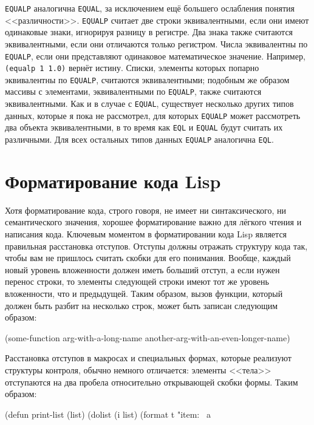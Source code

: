 \lstinline{EQUALP} аналогична \lstinline{EQUAL}, за исключением ещё большего ослабления понятия
<<различности>>. \lstinline{EQUALP} считает две строки эквивалентными, если они имеют
одинаковые знаки, игнорируя разницу в регистре. Два знака также считаются эквивалентными,
если они отличаются только регистром. Числа эквивалентны по \lstinline{EQUALP}, если они
представляют одинаковое математическое значение. Например, \lstinline{(equalp 1 1.0)} вернёт
истину. Списки, элементы которых попарно эквивалентны по \lstinline{EQUALP}, считаются
эквивалентными; подобным же образом массивы с элементами, эквивалентными по
\lstinline{EQUALP}, также считаются эквивалентными. Как и в случае с \lstinline{EQUAL},
существует несколько других типов данных, которые я пока не рассмотрел, для которых
\lstinline{EQUALP} может рассмотреть два объекта эквивалентными, в то время как \lstinline{EQL}
и \lstinline{EQUAL} будут считать их различными. Для всех остальных типов данных
\lstinline{EQUALP} аналогична \lstinline{EQL}.

\section{Форматирование кода Lisp}

Хотя форматирование кода, строго говоря, не имеет ни синтаксического, ни семантического
значения, хорошее форматирование важно для лёгкого чтения и написания кода. Ключевым
моментом в форматировании кода Lisp является правильная расстановка отступов. Отступы
должны отражать структуру кода так, чтобы вам не пришлось считать скобки для его
понимания. Вообще, каждый новый уровень вложенности должен иметь больший отступ, а если
нужен перенос строки, то элементы следующей строки имеют тот же уровень вложенности, что и
предыдущей. Таким образом, вызов функции, который должен быть разбит на несколько строк,
может быть записан следующим образом:

\begin{myverb}
(some-function arg-with-a-long-name
               another-arg-with-an-even-longer-name)
\end{myverb}

Расстановка отступов в макросах и специальных формах, которые реализуют структуры
контроля, обычно немного отличается: элементы <<тела>> отступаются на два пробела
относительно открывающей скобки формы. Таким образом:

\begin{myverb}
(defun print-list (list)
  (dolist (i list)
    (format t "item: ~a~%
\end{myverb}

